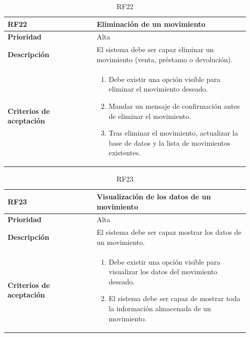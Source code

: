 \begin{table}[H]
	\centering %
	\begin{tabular}{|p{0.35\linewidth}|p{0.6\linewidth}|}
		\hline
		\rowcolor{grayshade} \textbf{RF22} & \textbf{Eliminación de un  movimiento} \\
		\hline
		\textbf{Prioridad} & Alta \\
		\hline
		\textbf{Descripción} & El sistema debe ser capaz eliminar un movimiento (venta, préstamo o devolución).\\
		\hline
		\vspace{0.5mm}
		\textbf{Criterios de aceptación} & 
		\begin{minipage}[t]{0.9\linewidth}
			\begin{enumerate}
				\item Debe existir una opción visible para eliminar el movimiento deseado.
				\item Mandar un mensaje de confirmación antes de eliminar el movimiento. 
				\item Tras eliminar el movimiento, actualizar la base de datos y la lista de movimientos existentes.  
			\end{enumerate}
			\vspace{2mm}
		\end{minipage} \\
		\hline
	\end{tabular}
	\caption{RF22}
\end{table}

\begin{table}[H]
	\centering %
	\begin{tabular}{|p{0.35\linewidth}|p{0.6\linewidth}|}
		\hline
		\rowcolor{grayshade} \textbf{RF23} & \textbf{Visualización de los datos de un movimiento} \\
		\hline
		\textbf{Prioridad} & Alta \\
		\hline
		\textbf{Descripción} & El sistema debe ser capaz mostrar los datos de un movimiento.\\
		\hline
		\vspace{0.5mm}
		\textbf{Criterios de aceptación} & 
		\begin{minipage}[t]{0.9\linewidth}
			\begin{enumerate}
				\item Debe existir una opción visible para visualizar los datos del movimiento deseado.
				\item El sistema debe ser capaz de mostrar toda la información almacenada de un movimiento.  
			\end{enumerate}
			\vspace{2mm}
		\end{minipage} \\
		\hline
	\end{tabular}
	\caption{RF23}
\end{table}


